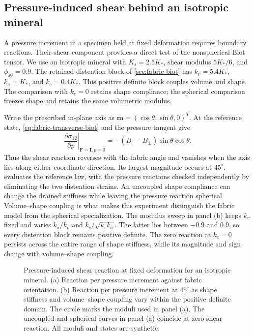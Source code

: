 \subsection{Pressure-induced shear behind an isotropic mineral}
\label{sec:fabric-pressure-shear}

A pressure increment in a specimen held at fixed deformation requires
boundary reactions. Their shear component provides a direct test of the
nonspherical Biot tensor. We use an isotropic mineral with
\(K_s=2.5K_*\), shear modulus \(5K_*/6\), and
\(\phi_{s0}=0.9\). The retained distention block of
\cref{sec:fabric-biot} has \(k_v=5.4K_*\), \(k_a=K_*\), and
\(k_c=0.4K_*\). This positive definite block couples volume and shape.
The comparison with \(k_c=0\) retains shape compliance; the spherical
comparison freezes shape and retains the same volumetric modulus.

Write the prescribed in-plane axis as
\(\mathbf m=(\cos\theta,\sin\theta,0)^T\). At the reference state,
\eqref{eq:fabric-transverse-biot} and the pressure tangent give
\begin{equation}
 \left.\frac{\partial\sigma_{12}}{\partial p}\right|_{\mathbf F=\mathbf I,p=0}
 =-(B_\parallel-B_\perp)\sin\theta\cos\theta.
 \label{eq:fabric-pressure-shear-reaction}
\end{equation}
Thus the shear reaction reverses with the fabric angle and vanishes when
the axis lies along either coordinate direction. Its largest magnitude
occurs at \(45^\circ\).  evaluates the
reference law, with the pressure reactions checked independently by
eliminating the two distention strains. An uncoupled shape compliance can
change the drained stiffness while leaving the pressure reaction
spherical. Volume--shape coupling is what makes this experiment distinguish
the fabric model from the spherical specialization. The modulus sweep
in panel (b) keeps \(k_v\) fixed and varies \(k_a/k_v\) and
\(k_c/\sqrt{k_vk_a}\). The latter lies between \(-0.9\) and
\(0.9\), so every distention block remains positive definite.
The zero reaction at \(k_c=0\) persists across the entire range of
shape stiffness, while its magnitude and sign change with volume--shape
coupling.

\begin{figure}[htbp]
 \centering
 \caption{Pressure-induced shear reaction at fixed deformation for an
 isotropic mineral. (a) Reaction per pressure increment against fabric
 orientation. (b) Reaction per pressure increment at \(45^\circ\) as
 shape stiffness and volume--shape coupling vary within the positive
 definite domain. The circle marks the moduli used in panel (a). The
 uncoupled and spherical curves in panel (a) coincide at zero shear reaction. All moduli and states are synthetic.}
 \label{fig:fe-fabric-probe}
\end{figure}

